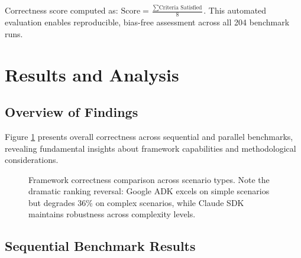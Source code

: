 \documentclass[sigconf,nonacm]{acmart}
\begin{document}
Correctness score computed as: $\text{Score} = \frac{\sum \text{Criteria Satisfied}}{8}$. This automated evaluation enables reproducible, bias-free assessment across all 204 benchmark runs.

\section{Results and Analysis}

\subsection{Overview of Findings}

Figure \ref{fig:correctness_comparison} presents overall correctness across sequential and parallel benchmarks, revealing fundamental insights about framework capabilities and methodological considerations.

\begin{figure}[t]
\centering
{}
\caption{Framework correctness comparison across scenario types. Note the dramatic ranking reversal: Google ADK excels on simple scenarios but degrades 36\% on complex scenarios, while Claude SDK maintains robustness across complexity levels.}
\label{fig:correctness_comparison}
\end{figure}

\subsection{Sequential Benchmark Results}
\end{document}
